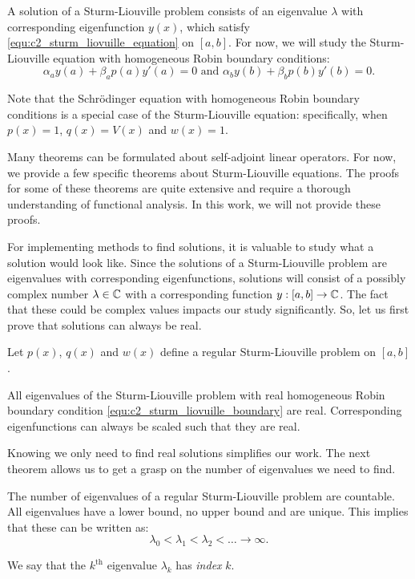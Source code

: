 A solution of a Sturm-Liouville problem consists of an eigenvalue $\lambda$ with corresponding eigenfunction $y(x)$, which satisfy \eqref{equ:c2_sturm_liovuille_equation} on $[a, b]$. For now, we will study the Sturm-Liouville equation with homogeneous Robin boundary conditions:
\begin{equation}\label{equ:c2_sturm_liovuille_boundary}
    \alpha_a y(a) + \beta_a p(a) y'(a) = 0 \text{ and } \alpha_b y(b) + \beta_b p(b) y'(b) = 0\text{.}
\end{equation}

Note that the Schrödinger equation with homogeneous Robin boundary conditions is a special case of the Sturm-Liouville equation: specifically, when $p(x) = 1$, $q(x) = V(x)$ and $w(x) = 1$.

Many theorems can be formulated about self-adjoint linear operators. For now, we provide a few specific theorems about Sturm-Liouville equations. The proofs for some of these theorems are quite extensive and require a thorough understanding of functional analysis. In this work, we will not provide these proofs.

For implementing methods to find solutions, it is valuable to study what a solution would look like. Since the solutions of a Sturm-Liouville problem are eigenvalues with corresponding eigenfunctions, solutions will consist of a possibly complex number $\lambda \in \mathbb{C}$ with a corresponding function $y : [a, b] \to \mathbb{C}$. The fact that these could be complex values impacts our study significantly. So, let us first prove that solutions can always be real.

\begin{theorem}\label{the:c2_real_eigenvalues}
    Let $p(x)$, $q(x)$ and $w(x)$ define a regular Sturm-Liouville problem on $[a, b]$.

    All eigenvalues of the Sturm-Liouville problem with real homogeneous Robin boundary condition \eqref{equ:c2_sturm_liovuille_boundary} are real. Corresponding eigenfunctions can always be scaled such that they are real.
\end{theorem}

Knowing we only need to find real solutions simplifies our work. The next theorem allows us to get a grasp on the number of eigenvalues we need to find.

\begin{theorem}\label{the:c2_slp_countable}
    The number of eigenvalues of a regular Sturm-Liouville problem are countable. All eigenvalues have a lower bound, no upper bound and are unique. This implies that these can be written as:
    $$
        \lambda_0 < \lambda_1 < \lambda_2 < \dots \to \infty \text{.}
    $$

    We say that the $k^{\text{th}}$ eigenvalue $\lambda_k$ has \emph{index} $k$.
\end{theorem}


